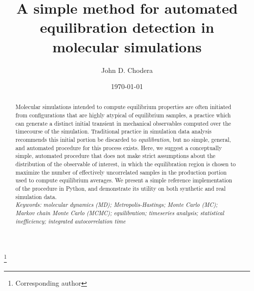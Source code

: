 \documentclass[aps,pre,twocolumn,nofootinbib,superscriptaddress,linenumbers,11point]{revtex4-1}
\begin{document}

\title{A simple method for automated equilibration detection in molecular simulations}

\author{John D. Chodera}
 \thanks{Corresponding author}

\date{\today}


\begin{abstract}

Molecular simulations intended to compute equilibrium properties are often initiated from configurations that are highly atypical of equilibrium samples, a practice which can generate a distinct initial transient in mechanical observables computed over the timecourse of the simulation.
Traditional practice in simulation data analysis recommends this initial portion be discarded to \emph{equilibration}, but no simple, general, and automated procedure for this process exists.
Here, we suggest a conceptually simple, automated procedure that does not make strict assumptions about the distribution of the observable of interest, in which the equilibration region is chosen to maximize the number of effectively uncorrelated samples in the production portion used to compute equilibrium averages.
We present a simple reference implementation of the procedure in Python, and demonstrate its utility on both synthetic and real simulation data.\\

\emph{Keywords: molecular dynamics (MD); Metropolis-Hastings; Monte Carlo (MC); Markov chain Monte Carlo (MCMC); equilibration; timeseries analysis; statistical inefficiency; integrated autocorrelation time}

\end{abstract}

\maketitle


\end{document}
